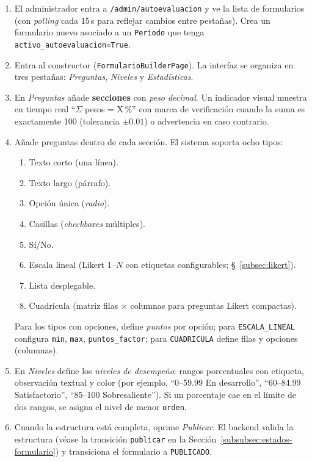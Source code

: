 \begin{enumerate}
    \item El administrador entra a \texttt{/admin/autoevaluacion} y ve la lista de formularios (con \emph{polling} cada 15\,s para reflejar cambios entre pestañas). Crea un formulario nuevo asociado a un \texttt{Periodo} que tenga \texttt{activo\_autoevaluacion=True}.
    \item Entra al constructor (\texttt{FormularioBuilderPage}). La interfaz se organiza en tres pestañas: \emph{Preguntas}, \emph{Niveles} y \emph{Estadísticas}.
    \item En \emph{Preguntas} añade \textbf{secciones} con \emph{peso decimal}. Un indicador visual muestra en tiempo real ``$\Sigma$ pesos = X\,\%'' con marca de verificación cuando la suma es exactamente 100 (tolerancia $\pm 0.01$) o advertencia en caso contrario.
    \item Añade preguntas dentro de cada sección. El sistema soporta ocho tipos:
    \begin{enumerate}
        \item Texto corto (una línea).
        \item Texto largo (párrafo).
        \item Opción única (\emph{radio}).
        \item Casillas (\emph{checkboxes} múltiples).
        \item Sí/No.
        \item Escala lineal (Likert 1--$N$ con etiquetas configurables; \S~\ref{subsec:likert}).
        \item Lista desplegable.
        \item Cuadrícula (matriz filas $\times$ columnas para preguntas Likert compactas).
    \end{enumerate}
    Para los tipos con opciones, define \emph{puntos} por opción; para \texttt{ESCALA\_LINEAL} configura \texttt{min}, \texttt{max}, \texttt{puntos\_factor}; para \texttt{CUADRICULA} define filas y opciones (columnas).
    \item En \emph{Niveles} define los \emph{niveles de desempeño}: rangos porcentuales con etiqueta, observación textual y color (por ejemplo, ``0--59.99 En desarrollo'', ``60--84.99 Satisfactorio'', ``85--100 Sobresaliente''). Si un porcentaje cae en el límite de dos rangos, se asigna el nivel de menor \texttt{orden}.
    \item Cuando la estructura está completa, oprime \emph{Publicar}. El backend valida la estructura (véase la transición \texttt{publicar} en la Sección~\ref{subsubsec:estados-formulario}) y transiciona el formulario a \texttt{PUBLICADO}.
\end{enumerate}

